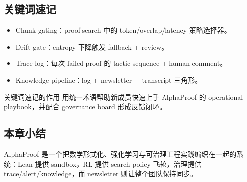\subsection{关键词速记}
\begin{itemize}
    \item Chunk gating：proof search 中的 token/overlap/latency 策略选择器。
    \item Drift gate：entropy 下降触发 fallback + review。
    \item Trace log：每次 failed proof 的 tactic sequence + human comment。
    \item Knowledge pipeline：log + newsletter + transcript 三角形。
\end{itemize}
\begin{knowledgebox}{关键词速记的作用}
用统一术语帮助新成员快速上手 AlphaProof 的 operational playbook，并配合 governance board 形成反馈闭环。
\end{knowledgebox}

\subsection{本章小结}
AlphaProof 是一个把数学形式化、强化学习与可治理工程实践编织在一起的系统：Lean 提供 sandbox，RL 提供 search-policy 飞轮，治理提供 trace/alert/knowledge，而 newsletter 则让整个团队保持同步。


